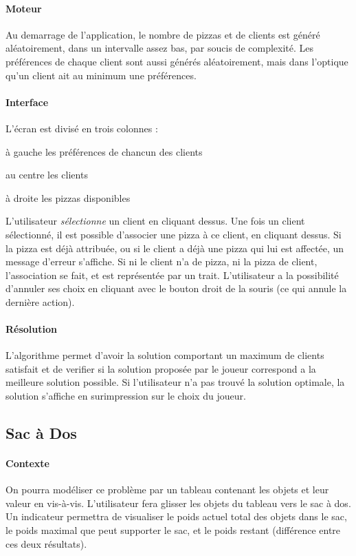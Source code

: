 		\paragraph{Moteur}
			Au demarrage de l'application, le nombre de pizzas et 
			 de clients est généré aléatoirement, dans un intervalle 
			 assez bas, par soucis de complexité.
			Les préférences de chaque client sont aussi générés aléatoirement,
			 mais dans l'optique qu'un client ait au minimum une préférences.
		\paragraph{Interface}
		    L'écran est divisé en trois colonnes :
		    \begin{item}
		        \item[à gauche] les préférences de chancun des clients
		        \item[au centre] les clients
		        \item[à droite] les pizzas disponibles
		    \end{item}

		L'utilisateur \emph{sélectionne} un client en cliquant dessus.
		    Une fois un client sélectionné, il est possible
		    d'associer une pizza à ce client, en cliquant dessus.
		    Si la pizza est déjà attribuée, ou si le client a déjà
		    une pizza qui lui est affectée, un message d'erreur s'affiche.
		    Si ni le client n'a de pizza, ni la pizza de client, l'association
		    se fait, et est représentée par un trait.
		L'utilisateur a la possibilité d'annuler ses choix en cliquant avec le bouton
		    droit de la souris (ce qui annule la dernière action).
		\paragraph{Résolution}
			L'algorithme permet d'avoir la solution comportant un maximum de clients
			 satisfait et de verifier si la solution proposée par le joueur correspond
			 a la meilleure solution possible.
 			Si l'utilisateur n'a pas trouvé la solution optimale, la solution s'affiche
			 en surimpression sur le choix du joueur.



    \subsection{Sac à Dos}
        \paragraph{Contexte}
        On pourra modéliser ce problème par un tableau contenant les objets et leur
        valeur en vis-à-vis. L'utilisateur fera glisser les objets du tableau vers
        le sac à dos. Un indicateur permettra de visualiser le poids actuel total
        des objets dans le sac, le poids maximal que peut supporter le sac, et le
        poids restant (différence entre ces deux résultats).

